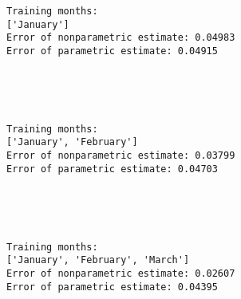 \documentclass[11pt]{article}
\begin{document}
    \begin{Verbatim}[commandchars=\\\{\}]
Training months:
['January']
Error of nonparametric estimate: 0.04983
Error of parametric estimate: 0.04915
    \end{Verbatim}

    \begin{center}
    \end{center}
    { \hspace*{\fill} \\}
    
    \begin{center}
    \end{center}
    { \hspace*{\fill} \\}
    
    \begin{Verbatim}[commandchars=\\\{\}]
Training months:
['January', 'February']
Error of nonparametric estimate: 0.03799
Error of parametric estimate: 0.04703
    \end{Verbatim}

    \begin{center}
    \end{center}
    { \hspace*{\fill} \\}
    
    \begin{center}
    \end{center}
    { \hspace*{\fill} \\}
    
    \begin{Verbatim}[commandchars=\\\{\}]
Training months:
['January', 'February', 'March']
Error of nonparametric estimate: 0.02607
Error of parametric estimate: 0.04395
    \end{Verbatim}

    \begin{center}
    \end{center}
    { \hspace*{\fill} \\}
    
\end{document}
